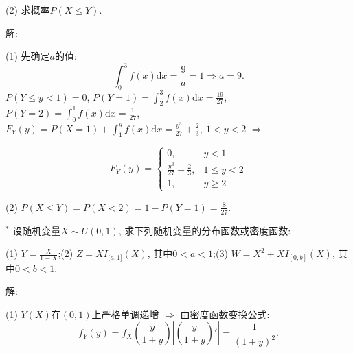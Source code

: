 \documentclass[standard]{ExBook}
\begin{document}
\begin{qitems}
\begin{bbox}
\begin{shaded}
(2) 求概率$P(X\leq Y)$.
    \end{shaded}
    \end{bbox}

\vspace{-5em}

    \begin{bbox}
解: 

(1) 先确定$a$的值:
$$\displaystyle\int_{0}^{3}f(x)\mathrm{d}x=\frac{9}{a}=1 \Longrightarrow a=9.$$
$P(Y\leq y<1)=0$, $P(Y=1)=\displaystyle\int_{2}^{3}f(x)\mathrm{d}x=\frac{19}{27}$, $P(Y=2)=\displaystyle\int_{0}^{1}f(x)\mathrm{d}x=\frac{1}{27}$, $F_{Y}(y)=P(X=1)+\displaystyle\int_{1}^{y}f(x)\mathrm{d}x=\frac{y^3}{27}+\frac{2}{3},\ 1<y<2$ $\Longrightarrow$
\vspace{-2em}
\begin{center}
\begin{equation}
    F_{Y}(y)=
    \left\{
    \begin{array}{cl}
        \nonumber
        0, &y<1\\
        \frac{y^3}{27}+\frac{2}{3}, &1\leq y<2\\
        1, &y\geq 2
    \end{array}
    \right.
\end{equation}
\end{center}
(2) $P(X\leq Y)=P(X<2)=1-P(Y=1)=\displaystyle\frac{8}{27}$.
    \end{bbox}

\vspace{-5em}

    \begin{bbox}
    \begin{shaded}
        \qitem$^{*}$
设随机变量$X\sim U(0,1)$, 求下列随机变量的分布函数或密度函数:

(1) $Y=\frac{X}{1-X}$;\qquad(2) $Z=XI_{(a,1]}(X)$, 其中$0 < a < 1$;\qquad(3) $W=X^2+XI_{[0,b]}(X)$, 其中$0 < b < 1$.
    \end{shaded}
    \end{bbox}

\vspace{-5em}

    \begin{bbox}
解: 

(1) $Y(X)$在$(0,1)$上严格单调递增 $\Longrightarrow$ 由密度函数变换公式:
$$f_{Y}(y)=f_{X}(\displaystyle\frac{y}{1+y})\left|\left(\displaystyle\frac{y}{1+y}\right)'\right|=\displaystyle\frac{1}{(1+y)^2}.$$
    \end{bbox}


\end{qitems}
\end{document}
